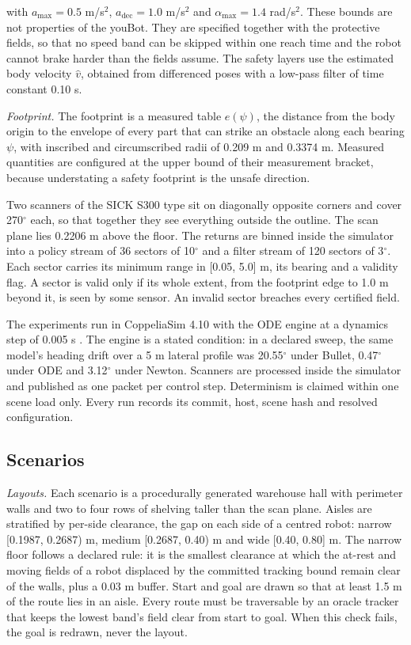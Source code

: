 with $a_{\max} = 0.5$ m/s$^2$, $a_{\mathrm{dec}} = 1.0$ m/s$^2$ and $\alpha_{\max} = 1.4$ rad/s$^2$. These bounds are not properties of the youBot. They are specified together with the protective fields, so that no speed band can be skipped within one reach time and the robot cannot brake harder than the fields assume. The safety layers use the estimated body velocity $\hat v$, obtained from differenced poses with a low-pass filter of time constant 0.10 s.

\emph{Footprint.} The footprint is a measured table $e(\psi)$, the distance from the body origin to the envelope of every part that can strike an obstacle along each bearing $\psi$, with inscribed and circumscribed radii of 0.209 m and 0.3374 m. Measured quantities are configured at the upper bound of their measurement bracket, because understating a safety footprint is the unsafe direction.

Two scanners of the SICK S300 type sit on diagonally opposite corners and cover 270$^\circ$ each, so that together they see everything outside the outline. The scan plane lies 0.2206 m above the floor. The returns are binned inside the simulator into a policy stream of 36 sectors of 10$^\circ$ and a filter stream of 120 sectors of 3$^\circ$. Each sector carries its minimum range in [0.05, 5.0] m, its bearing and a validity flag. A sector is valid only if its whole extent, from the footprint edge to 1.0 m beyond it, is seen by some sensor. An invalid sector breaches every certified field.

The experiments run in CoppeliaSim 4.10 with the ODE engine at a dynamics step of 0.005 s \cite{rohmer2013vrep}. The engine is a stated condition: in a declared sweep, the same model's heading drift over a 5 m lateral profile was 20.55$^\circ$ under Bullet, 0.47$^\circ$ under ODE and 3.12$^\circ$ under Newton. Scanners are processed inside the simulator and published as one packet per control step. Determinism is claimed within one scene load only. Every run records its commit, host, scene hash and resolved configuration.

\subsection{Scenarios}

\emph{Layouts.} Each scenario is a procedurally generated warehouse hall with perimeter walls and two to four rows of shelving taller than the scan plane. Aisles are stratified by per-side clearance, the gap on each side of a centred robot: narrow [0.1987, 0.2687) m, medium [0.2687, 0.40) m and wide [0.40, 0.80] m. The narrow floor follows a declared rule: it is the smallest clearance at which the at-rest and moving fields of a robot displaced by the committed tracking bound remain clear of the walls, plus a 0.03 m buffer. Start and goal are drawn so that at least 1.5 m of the route lies in an aisle. Every route must be traversable by an oracle tracker that keeps the lowest band's field clear from start to goal. When this check fails, the goal is redrawn, never the layout.

